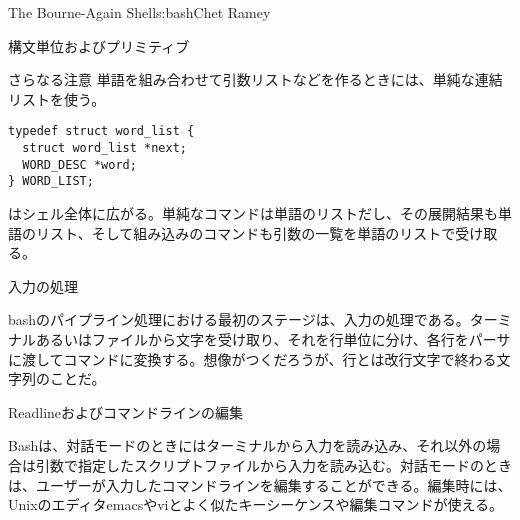 \begin{aosachapter}{The Bourne-Again Shell}{s:bash}{Chet Ramey}
\begin{aosasect1}{構文単位およびプリミティブ}
\begin{aosasect2}{さらなる注意}
\noindent 単語を組み合わせて引数リストなどを作るときには、単純な連結リストを使う。

\begin{verbatim}
typedef struct word_list {
  struct word_list *next;
  WORD_DESC *word;
} WORD_LIST;
\end{verbatim}

はシェル全体に広がる。単純なコマンドは単語のリストだし、その展開結果も単語のリスト、そして組み込みのコマンドも引数の一覧を単語のリストで受け取る。

\end{aosasect2}

\end{aosasect1}

\begin{aosasect1}{入力の処理}

bashのパイプライン処理における最初のステージは、入力の処理である。ターミナルあるいはファイルから文字を受け取り、それを行単位に分け、各行をパーサに渡してコマンドに変換する。想像がつくだろうが、行とは改行文字で終わる文字列のことだ。

\begin{aosasect2}{Readlineおよびコマンドラインの編集}

Bashは、対話モードのときにはターミナルから入力を読み込み、それ以外の場合は引数で指定したスクリプトファイルから入力を読み込む。対話モードのときは、ユーザーが入力したコマンドラインを編集することができる。編集時には、Unixのエディタemacsやviとよく似たキーシーケンスや編集コマンドが使える。


\end{aosasect2}
\end{aosasect1}
\end{aosachapter}
